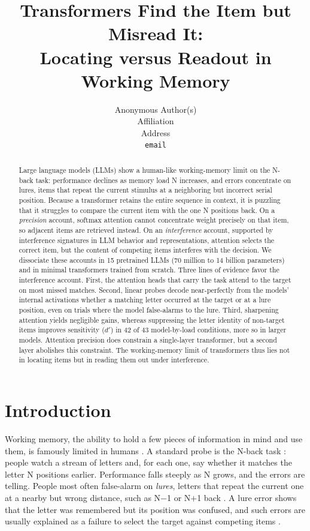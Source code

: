 \documentclass{article}
\title{Transformers Find the Item but Misread It:\\Locating versus Readout in Working Memory}
\author{%
  Anonymous Author(s) \\
  Affiliation \\
  Address \\
  \texttt{email} \\
}
\newcommand{\dprime}{$d'$}
\begin{document}
\maketitle

\begin{abstract}
Large language models (LLMs) show a human-like working-memory limit on the N-back task: performance declines as memory load N increases, and errors concentrate on lures, items that repeat the current stimulus at a neighboring but incorrect serial position. Because a transformer retains the entire sequence in context, it is puzzling that it struggles to compare the current item with the one N positions back. On a \emph{precision} account, softmax attention cannot concentrate weight precisely on that item, so adjacent items are retrieved instead. On an \emph{interference} account, supported by interference signatures in LLM behavior and representations, attention selects the correct item, but the content of competing items interferes with the decision. We dissociate these accounts in 15 pretrained LLMs (70 million to 14 billion parameters) and in minimal transformers trained from scratch. Three lines of evidence favor the interference account. First, the attention heads that carry the task attend to the target on most missed matches. Second, linear probes decode near-perfectly from the models' internal activations whether a matching letter occurred at the target or at a lure position, even on trials where the model false-alarms to the lure. Third, sharpening attention yields negligible gains, whereas suppressing the letter identity of non-target items improves sensitivity (\dprime{}) in 42 of 43 model-by-load conditions, more so in larger models. Attention precision does constrain a single-layer transformer, but a second layer abolishes this constraint. The working-memory limit of transformers thus lies not in locating items but in reading them out under interference.
\end{abstract}

\section{Introduction}
\label{sec:intro}

Working memory, the ability to hold a few pieces of information in mind and use them, is famously limited in humans \citep{cowan2001magical,ma2014changing}. A standard probe is the N-back task \citep{kirchner1958age}: people watch a stream of letters and, for each one, say whether it matches the letter N positions earlier. Performance falls steeply as N grows, and the errors are telling. People most often false-alarm on \emph{lures}, letters that repeat the current one at a nearby but wrong distance, such as N$-$1 or N$+$1 back \citep{kane2007nback}. A lure error shows that the letter was remembered but its position was confused, and such errors are usually explained as a failure to select the target against competing items \citep{engle2002executive,oberauer2012interference,szmalec2011interference}.
\end{document}
